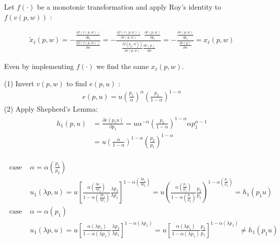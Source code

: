 \begin{enumerate}[label=(\alph*)]
{\item 
Let $f(\cdot)$ be a monotonic transformation and apply Roy's identity to $f(v(p, w))$ :

\begin{align*}
    \tilde{x}_\ell(p, w)
    =-\frac{\frac{\partial f(v(p, w))}{\partial p_\ell}}{\frac{\partial f(v(p, w))}{\partial w}}
    =-\frac{\frac{\partial f(v(p, w))}{\partial v(p, w)} \cdot \frac{\partial v(p, w)}{\partial p_\ell}}{\frac{\left.\partial f\left(p_p, w\right)\right)}{\partial v(p, w)} \frac{\partial v(p)}{\partial w}}
    =-\frac{\frac{\partial v(p, w)}{\partial p_\ell}}{\frac{\partial v(p)}{\partial w}}
    =x_\ell(p, w)
\end{align*}

Even by implementing $f(\cdot)$ we find the same $x_\ell(p, w)$.
}
{\item 
(1) Invert $v(p, w)$ to find $e(p, u)$ :
\begin{align*}
e(p, u)=u\left(\frac{p_1}{\alpha}\right)^\alpha\left(\frac{p_2}{1-\alpha}\right)^{1-\alpha}
\end{align*}
(2) Apply Shepherd's Lemma:
\begin{align*}
\begin{aligned}
h_1(p, u) & =\frac{\partial e\left(p_1 u\right)}{\partial p_1}=u \alpha^{-\alpha}\left(\frac{p_2}{1-\alpha}\right)^{1-\alpha} \alpha p_1^{\alpha-1} \\
& =u\left(\frac{\alpha}{1-\alpha}\right)^{1-\alpha}\left(\frac{p_2}{p_1}\right)^{1-\alpha}
\end{aligned}
\end{align*}
}
{\item 
\begin{align*}
    \text { case 1: } & \alpha=\alpha\left(\frac{p_1}{p_2}\right) \\
    & u_1\left(\lambda p, u\right) = u\left[\frac{\alpha\left(\frac{\lambda p_1}{\lambda p_2}\right)}{1-\alpha\left(\frac{\lambda p_1}{\lambda p_1}\right)} \frac{\lambda p_2}{\lambda p_1}\right]^{1-\alpha\left(\frac{\lambda p_1}{\lambda p_2}\right)} 
    = u \left( \frac{\alpha\left(\frac{p_1}{p_2}\right)}{1-\alpha\left(\frac{p_1}{p_2}\right)} \frac{p_2}{p_1}\right)^{1-\alpha\left(\frac{p_1}{p_2}\right)}=h_1\left(p_1 u\right) \\
    \text { case 2: } & \alpha=\alpha\left(p_1\right) \\
    & u_1\left(\lambda p, u\right) = u\left[\frac{\alpha\left(\lambda p_1\right)}{1-\alpha\left(\lambda p_1\right)} \frac{\lambda p_2}{\lambda p_1}\right]^{1-\alpha\left(\lambda p_1\right)} 
    = u\left[\frac{\alpha\left(\lambda p_1\right)}{1-\alpha\left(\lambda p_1\right)} \frac{ p_2}{ p_1}\right]^{1-\alpha\left(\lambda p_1\right)} \neq h_1\left(p_1 u\right)
\end{align*}
}
\end{enumerate}

